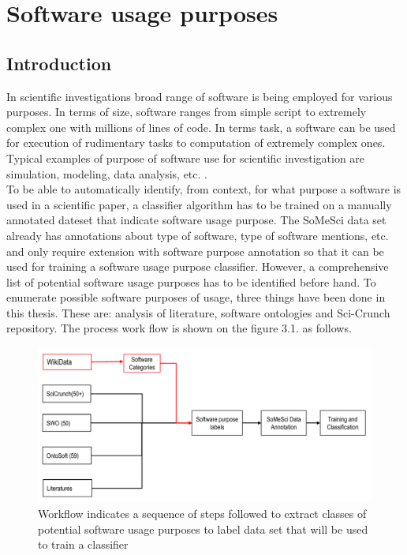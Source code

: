 \chapter{Software usage purposes}
\label{ch:purpose}

%
%
\section{Introduction}
\label{sec:purpose:intro}

In scientific investigations broad range of software is being employed for various purposes. In terms of size, software ranges from simple script to extremely complex one with millions of lines of code. In terms task, a software can be used for execution of rudimentary tasks to computation of extremely complex ones. Typical examples of purpose of software use for scientific investigation are simulation, modeling, data analysis, etc. \citep{goble2014better}. \\


To be able to automatically identify, from context, for what purpose a software is used in a scientific paper, a classifier algorithm has to be trained on a manually annotated dateset that indicate software usage purpose. The \ac{SoMeSci} data set already has annotations about type of software, type of software mentions, etc. and only require extension with software purpose annotation so that it can be used for training a software usage purpose classifier. However, a comprehensive list of potential software usage purposes has to be identified before hand. To enumerate possible software purposes of usage, three things have been done in this thesis. These are:
analysis of literature,  software ontologies and Sci-Crunch repository. The process work flow is shown on the figure 3.1. as follows.  

\begin{figure}[htbp]
	\centering
	\includegraphics[width=1\textwidth]{4.graphics/figures/ch_3/softwarePurposeprocess}
	\caption{Workflow indicates a sequence of steps followed to extract classes of potential software usage purposes to label data set that will be used to train a classifier }
	\label{fig:chapter03:setup}
\end{figure}


